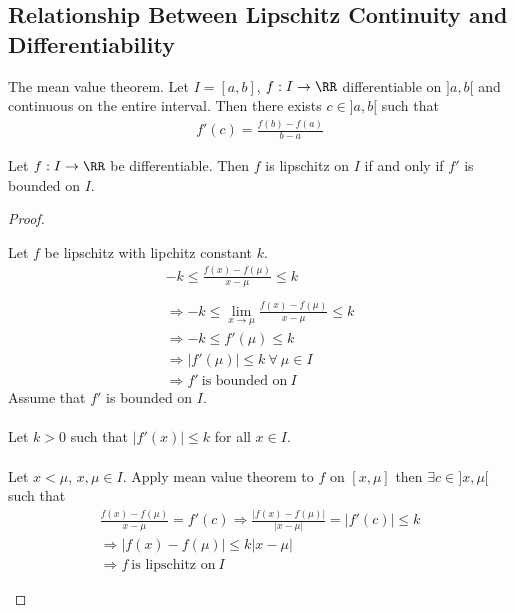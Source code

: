 \documentclass[class=scrartcl, crop=false]{standalone}
\begin{document}
\subsection{Relationship Between Lipschitz Continuity and Differentiability}

\begin{recall}
  The mean value theorem. Let $I = [a, b]$, $f: I \to \RR$ differentiable on $]a, b[$ and continuous on the entire interval. Then there exists $c \in ]a, b[$ such that
  \begin{gather*}
    f'(c) = \frac{f(b) - f(a)}{b - a}
  \end{gather*} 
\end{recall} 

\begin{theorem}
  Let $f: I \to \RR$ be differentiable. Then $f$ is lipschitz on $I$ if and only if $f'$ is bounded on $I$.
  \begin{proof}
    \begin{itemize}
      \ii["$\Rightarrow$"]
      Let $f$ be lipschitz with lipchitz constant $k$. 
      \begin{gather*}
        -k \leq \frac{f(x) - f(\mu)}{x - \mu} \leq k \\
        \\
        \Rightarrow
        -k \leq \lim_{x \to \mu}\frac{f(x) - f(\mu)}{x - \mu} \leq k \\
        \Rightarrow
        -k \leq f'(\mu) \leq k \\
        \Rightarrow |f'(\mu)| \leq k \ \forall \ \mu \in I \\
        \Rightarrow f' \ \text{is bounded on} \ I
      \end{gather*} 
      \ii["$\Leftarrow$"]
      Assume that $f'$ is bounded on $I$.
      \\\\
      Let $k > 0$ such that $|f'(x)| \leq k$ for all $x \in I$.
      \\\\
      Let $x < \mu$, $x, \mu \in I$. Apply mean value theorem to $f$ on $[x, \mu]$ then $\exists c \in ]x, \mu[$ such that 
      \begin{gather*}
        \frac{f(x) - f(\mu)}{x - \mu} = f'(c) \Rightarrow \frac{|f(x) - f(\mu)|}{|x - \mu|} = |f'(c)| \leq k
        \\
        \Rightarrow |f(x) - f(\mu)| \leq k|x - \mu| \\
        \Rightarrow f \ \text{is lipschitz on} \ I
      \end{gather*} 
    \end{itemize} 
  \end{proof} 
\end{theorem} 
\end{document}
